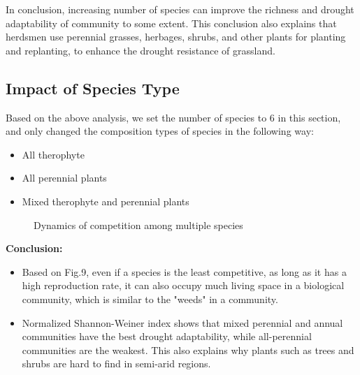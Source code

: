\documentclass{mcmthesis}
\begin{document}
	In conclusion, increasing number of species can improve the richness and drought adaptability of community to some extent. This conclusion also explains that herdsmen use perennial grasses, herbages, shrubs, and other plants for planting and replanting, to enhance the drought resistance of grassland.
	
\subsection{Impact of Species Type}
Based on the above analysis, we set the number of species to 6 in this section, and only changed the composition types of species in the following way:

\begin{itemize}
	\item All therophyte
	
	\item All perennial plants
	
	\item Mixed therophyte and perennial plants
	
\end{itemize}

\begin{figure}[h]\label{4.31}
	\centering
	\caption{Dynamics of competition among multiple species} 
\end{figure}

\textbf{Conclusion:}

\begin{itemize}
	\item Based on Fig.9, even if a species is the least competitive, as long as it has a high reproduction rate, it can also occupy much living space in a biological community, which is similar to the "weeds" in a community.
	
	\item Normalized Shannon-Weiner index shows that mixed perennial and annual communities have the best drought adaptability,  while all-perennial communities are the weakest. This also explains why plants such as trees and shrubs are hard to find in semi-arid regions.
	
\end{itemize}
\end{document}
